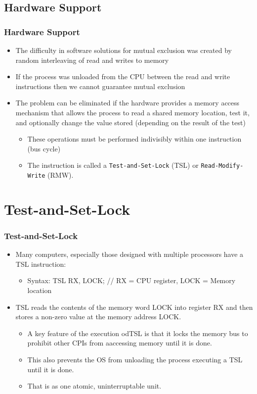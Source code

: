 \documentclass{beamer}
\begin{document}
\subsection{Hardware Support}
\begin{frame}
\frametitle{Hardware Support}
\begin{itemize}
\item The difficulty in software solutions for mutual exclusion was created by random interleaving of read and writes to memory
\item If the process was unloaded from the CPU between the read and write instructions then we cannot guarantee mutual exclusion
\item The problem can be eliminated if the hardware provides a memory access mechanism that allows the process to read a shared memory location, test it, and optionally change the value stored (depending on the result of the test)
\begin{itemize}
\item These operations must be performed indivisibly within one instruction (bus cycle)
\item The instruction is called a \texttt{Test-and-Set-Lock} (TSL) or \texttt{Read-Modify-Write} (RMW).
\end{itemize}
\end{itemize}
\end{frame}
\section{Test-and-Set-Lock}
\begin{frame}
\frametitle{Test-and-Set-Lock}
\begin{itemize}
\item Many computers, especially those designed with multiple processors have a TSL instruction:
\begin{itemize}
\item Syntax: TSL RX, LOCK; // RX = CPU register, LOCK = Memory location
\end{itemize}
\item TSL reads the contents of the memory word LOCK into register RX and then stores a non-zero value at the memory address LOCK.
\begin{itemize}
\item A key feature of the execution odTSL is that it locks the memory bus to prohibit other CPIs from aaccessing memory until it is done.
\item This also prevents the OS from unloading the process executing a TSL until it is done.
\item That is as one atomic, uninterruptable unit.
\end{itemize}
\end{itemize}
\end{frame}
\end{document}
